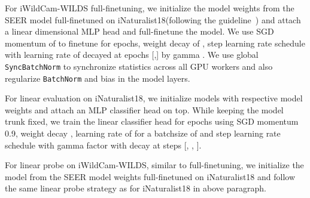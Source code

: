 \documentclass[10pt,twocolumn,letterpaper]{article}
\newcommand{\inat}{iNaturalist18\xspace}
\newcommand{\iwild}{iWildCam-WILDS\xspace}
\newcommand{\syncbn}{\texttt{SyncBatchNorm}\xspace}
\newcommand{\batchnorm}{\texttt{BatchNorm}\xspace}
\begin{document}
For \iwild full-finetuning, we initialize the model weights from the SEER model full-finetuned on \inat (following the guideline~\cite{beery2020iwildcam}) and attach a linear  dimensional MLP head and full-finetune the model. We use SGD momentum of  to finetune for  epochs, weight decay of , step learning rate schedule with learning rate of  decayed at epochs [,] by gamma . We use global \syncbn to synchronize statistics across all GPU workers and also regularize \batchnorm and bias in the model layers.

For linear evaluation on \inat, we initialize models with respective model weights and attach an MLP classifier head on top. While keeping the model trunk fixed, we train the linear classifier head for  epochs using SGD momentum 0.9, weight decay , learning rate of  for a batchsize of  and step learning rate schedule with gamma factor  with decay at steps [, , ]. 

For linear probe on \iwild, similar to full-finetuning, we initialize the model from the SEER model weights full-finetuned on \inat and follow the same linear probe strategy as for \inat in above paragraph.
\end{document}
